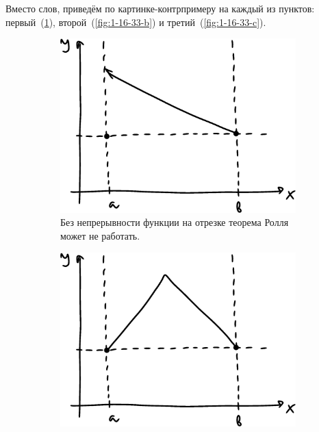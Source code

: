 \documentclass[a4paper,12pt]{article}
\begin{document}
  \begin{solution}
    Вместо слов, приведём по картинке-контрпримеру на каждый из пунктов:
    первый~(\ref{fig:1-16-33-a}), второй~(\ref{fig:1-16-33-b}) и третий~(\ref{fig:1-16-33-c}).

    \begin{figure}[ht]
      \centering
    
      \begin{subfigure}[b]{0.32\textwidth}
        \centering
    
        \includegraphics[width=\columnwidth]{images/not-roll-a}
    
        \caption{Без непрерывности функции на отрезке теорема Ролля может не работать.}
        \label{fig:1-16-33-a}
      \end{subfigure}
      \hfill
      \begin{subfigure}[b]{0.32\textwidth}
        \centering

        \includegraphics[width=\columnwidth]{images/not-roll-b}
        

\end{subfigure}
\end{figure}
\end{solution}
\end{document}
